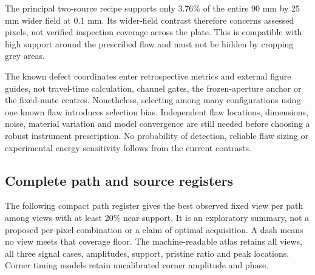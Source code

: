 The principal two-source recipe supports only 3.76\% of the entire 90 mm by 25 mm wider field at 0.1 mm. Its wider-field contrast therefore concerns assessed pixels, not verified inspection coverage across the plate. This is compatible with high support around the prescribed flaw and must not be hidden by cropping grey areas.

The known defect coordinates enter retrospective metrics and external figure guides, not travel-time calculation, channel gates, the frozen-aperture anchor or the fixed-mute centres. Nonetheless, selecting among many configurations using one known flaw introduces selection bias. Independent flaw locations, dimensions, noise, material variation and model convergence are still needed before choosing a robust instrument prescription. No probability of detection, reliable flaw sizing or experimental energy sensitivity follows from the current contrasts.

\subsection{Complete path and source registers}
The following compact path register gives the best observed fixed view per path among views with at least 20\% near support. It is an exploratory summary, not a proposed per-pixel combination or a claim of optimal acquisition. A dash means no view meets that coverage floor. The machine-readable atlas retains all views, all three signal cases, amplitudes, support, pristine ratio and peak locations. Corner timing models retain uncalibrated corner amplitude and phase.

